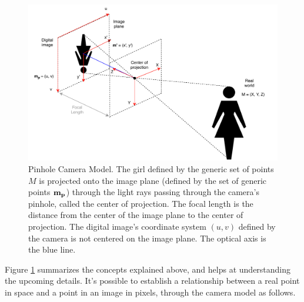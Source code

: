 \begin{figure}[ht]
	\centering
	\includegraphics[width=\textwidth]{images/cameraconcepts.pdf}
	\caption[Pinhole Camera Model]{Pinhole Camera Model. The girl defined by the generic set of points $M$ is projected onto the image plane (defined by the set of generic points $\bf m_{p}$) through the light rays passing through the camera's pinhole, called the center of projection. The focal length is the distance from the center of the image plane to the center of projection. The digital image's coordinate system $(u, v)$ defined by the camera is not centered on the image plane. The optical axis is the blue line.}
	\label{cha2:sec2:fig:camera_concepts}
\end{figure}

Figure \ref{cha2:sec2:fig:camera_concepts} summarizes the concepts explained above, and helps at understanding the upcoming details. It's possible to establish a relationship between a real point in space and a point in an image in pixels, through the camera model as follows.

